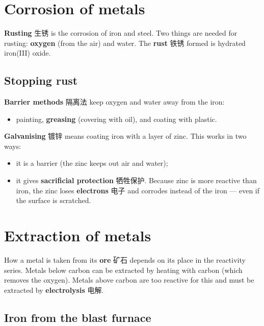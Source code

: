 \documentclass[11pt]{article}
\begin{document}
\section*{Corrosion of metals}

\textbf{Rusting} 生锈 is the corrosion of iron and steel. Two things are needed for rusting: \textbf{oxygen} (from the air) and water. The \textbf{rust} 铁锈 formed is hydrated iron(III) oxide.

\subsection*{Stopping rust}

\textbf{Barrier methods} 隔离法 keep oxygen and water away from the iron:

\begin{itemize}
\item painting, \textbf{greasing} (covering with oil), and coating with plastic.

\end{itemize}

\textbf{Galvanising} 镀锌 means coating iron with a layer of zinc. This works in two ways:

\begin{itemize}
\item it is a barrier (the zinc keeps out air and water);

\item it gives \textbf{sacrificial protection} 牺牲保护. Because zinc is more reactive than iron, the zinc loses \textbf{electrons} 电子 and corrodes instead of the iron — even if the surface is scratched.

\end{itemize}

\section*{Extraction of metals}

How a metal is taken from its \textbf{ore} 矿石 depends on its place in the reactivity series. Metals below carbon can be extracted by heating with carbon (which removes the oxygen). Metals above carbon are too reactive for this and must be extracted by \textbf{electrolysis} 电解.

\subsection*{Iron from the blast furnace}
\end{document}

